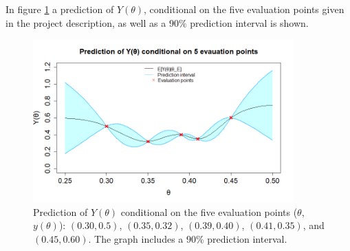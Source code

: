 In figure \ref{2afiveeval} a prediction of $Y(\theta)$, conditional on the five evaluation points given in the project description, as well as a $90\%$ prediction interval is shown.
 
\begin{figure}
    \centering
    \includegraphics[width=100mm]{2aPlot.png}
    \caption{Prediction of $Y(\theta)$ conditional on the five evaluation points  ($\theta$, $y(\theta)$): $(0.30,0.5)$, $(0.35,0.32)$, $(0.39,0.40)$, $(0.41,0.35)$, and $(0.45,0.60)$. The graph includes a $90\%$ prediction interval. }
    \label{2afiveeval}
\end{figure}


